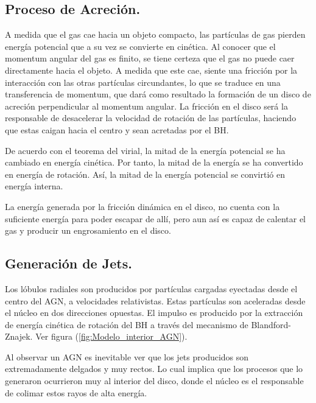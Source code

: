 	\subsection{Proceso de Acreción.}
	\label{subsec:Acretion}

A medida que el gas cae hacia un objeto compacto, las partículas de gas pierden energía potencial que a su vez se convierte en cinética. Al conocer que el momentum angular del gas es finito, se tiene certeza que el gas no puede caer directamente hacia el objeto. A medida que este cae, siente una fricción por la interacción con las otras partículas circundantes, lo que se traduce en una transferencia de momentum, que dará como resultado la formación de un disco de acreción perpendicular al momentum angular. La fricción en el disco será la responsable de desacelerar la velocidad de rotación de las partículas, haciendo que estas caigan hacia el centro y sean acretadas por el BH.  

De acuerdo con el teorema del virial, la mitad de la energía potencial se ha cambiado en energía cinética. Por tanto, la mitad de la energía se ha convertido en energía de rotación. Así, la mitad de la energía potencial se convirtió en energía interna. 

La energía generada por la fricción dinámica en el disco, no cuenta con la suficiente energía para poder escapar de allí, pero aun así es capaz de calentar el gas y producir un engrosamiento en el disco.


	\subsection{Generación de Jets.}
	\label{subsec:Generation_Jets}

Los lóbulos radiales son producidos por partículas cargadas eyectadas desde el centro del AGN, a velocidades relativistas. Estas partículas son aceleradas desde el núcleo en dos direcciones opuestas. El impulso es producido por la extracción de energía cinética de rotación del BH a través del mecanismo de Blandford- Znajek. Ver figura (\ref{fig:Modelo_interior_AGN}).%

Al observar un AGN es inevitable ver que los jets producidos son extremadamente delgados y muy rectos. Lo cual implica  que los procesos que lo generaron ocurrieron muy al interior del disco, donde el núcleo es el responsable de colimar estos rayos de alta energía. %

